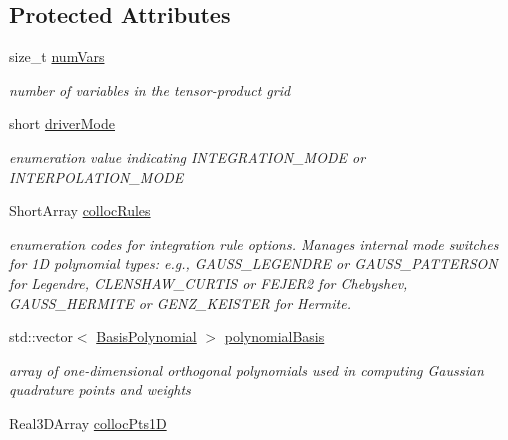\subsection*{Protected Attributes}
\begin{DoxyCompactItemize}
\item 
size\+\_\+t \hyperlink{classPecos_1_1IntegrationDriver_ab9ee2ca7227d7347a1ddba107ffb039c}{num\+Vars}\label{classPecos_1_1IntegrationDriver_ab9ee2ca7227d7347a1ddba107ffb039c}

\begin{DoxyCompactList}\small\item\em number of variables in the tensor-\/product grid \end{DoxyCompactList}\item 
short \hyperlink{classPecos_1_1IntegrationDriver_a676e4ebc2df53afb30f4a06155bc7d95}{driver\+Mode}\label{classPecos_1_1IntegrationDriver_a676e4ebc2df53afb30f4a06155bc7d95}

\begin{DoxyCompactList}\small\item\em enumeration value indicating I\+N\+T\+E\+G\+R\+A\+T\+I\+O\+N\+\_\+\+M\+O\+DE or I\+N\+T\+E\+R\+P\+O\+L\+A\+T\+I\+O\+N\+\_\+\+M\+O\+DE \end{DoxyCompactList}\item 
Short\+Array \hyperlink{classPecos_1_1IntegrationDriver_acb586d039200f1fb4d6b83b4f8999231}{colloc\+Rules}\label{classPecos_1_1IntegrationDriver_acb586d039200f1fb4d6b83b4f8999231}

\begin{DoxyCompactList}\small\item\em enumeration codes for integration rule options. Manages internal mode switches for 1D polynomial types\+: e.\+g., G\+A\+U\+S\+S\+\_\+\+L\+E\+G\+E\+N\+D\+RE or G\+A\+U\+S\+S\+\_\+\+P\+A\+T\+T\+E\+R\+S\+ON for Legendre, C\+L\+E\+N\+S\+H\+A\+W\+\_\+\+C\+U\+R\+T\+IS or F\+E\+J\+E\+R2 for Chebyshev, G\+A\+U\+S\+S\+\_\+\+H\+E\+R\+M\+I\+TE or G\+E\+N\+Z\+\_\+\+K\+E\+I\+S\+T\+ER for Hermite. \end{DoxyCompactList}\item 
std\+::vector$<$ \hyperlink{classPecos_1_1BasisPolynomial}{Basis\+Polynomial} $>$ \hyperlink{classPecos_1_1IntegrationDriver_a9b1c6d91c0a7c0dcf1c392e5f2481eec}{polynomial\+Basis}\label{classPecos_1_1IntegrationDriver_a9b1c6d91c0a7c0dcf1c392e5f2481eec}

\begin{DoxyCompactList}\small\item\em array of one-\/dimensional orthogonal polynomials used in computing Gaussian quadrature points and weights \end{DoxyCompactList}\item 
Real3\+D\+Array \hyperlink{classPecos_1_1IntegrationDriver_a245992931d5285b87bec708f153a5c70}{colloc\+Pts1D}\label{classPecos_1_1IntegrationDriver_a245992931d5285b87bec708f153a5c70}


\end{DoxyCompactItemize}
